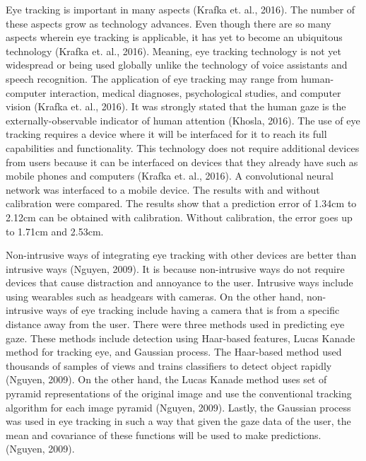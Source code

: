 Eye tracking is important in many aspects (Krafka et. al., 2016). The number of these aspects grow as technology advances. Even though there are so many aspects wherein eye tracking is applicable, it has yet to become an ubiquitous technology (Krafka et. al., 2016). Meaning, eye tracking technology is not yet widespread or being used globally unlike the technology of voice assistants and speech recognition. The application of eye tracking may range from human-computer interaction, medical diagnoses, psychological studies, and computer vision (Krafka et. al., 2016). It was strongly stated that the human gaze is the externally-observable indicator of human attention (Khosla, 2016). The use of eye tracking requires a device where it will be interfaced for it to reach its full capabilities and functionality. This technology does not require additional devices from users because it can be interfaced on devices that they already have such as mobile phones and computers (Krafka et. al., 2016). A convolutional neural network was interfaced to a mobile device. The results with and without calibration were compared. The results show that a prediction error of 1.34cm to 2.12cm can be obtained with calibration. Without calibration, the error goes up to 1.71cm and 2.53cm.
\newline 

Non-intrusive ways of integrating eye tracking with other devices are better than intrusive ways (Nguyen, 2009). It is because non-intrusive ways do not require devices that cause distraction and annoyance to the user. Intrusive ways include using wearables such as headgears with cameras. On the other hand, non-intrusive ways of eye tracking include having a camera that is from a specific distance away from the user. There were three methods used in predicting eye gaze. These methods include detection using Haar-based features, Lucas Kanade method for tracking eye, and Gaussian process. The Haar-based method used thousands of samples of views and trains classifiers to detect object rapidly (Nguyen, 2009). On the other hand, the Lucas Kanade method uses set of pyramid representations of the original image and use the conventional tracking algorithm for each image pyramid (Nguyen, 2009). Lastly, the Gaussian process was used in eye tracking in such a way that given the gaze data of the user, the mean and covariance of these functions will be used to make predictions. (Nguyen, 2009).

